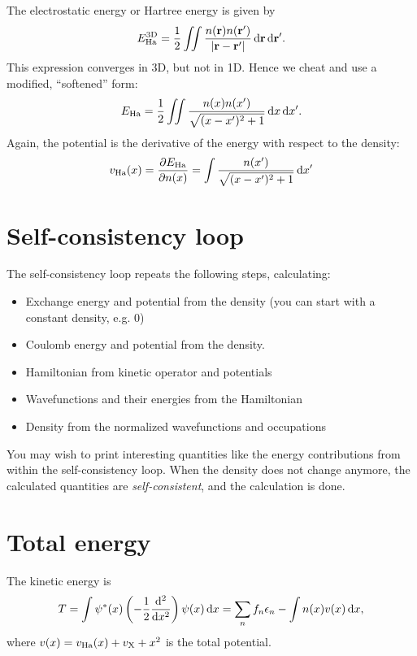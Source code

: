 \documentclass{article}
\begin{document}
The electrostatic energy or Hartree energy is given by
\begin{align}
  E_{\mathrm{Ha}}^{\mathrm{3D}} = \frac12 \iint \frac{n(\mathbf r)n(\mathbf r')}{|\mathbf r - \mathbf r'|}\,\mathrm d \mathbf r \,\mathrm d \mathbf r'.
\end{align}
This expression converges in 3D, but not in 1D.  Hence we cheat and use
a modified, ``softened'' form:
\begin{align}
E_{\mathrm{Ha}} = \frac12 \iint \frac{n(x) n(x')}{\sqrt{(x - x')^2 + 1}}
\,\mathrm d x \,\mathrm d x'.
\end{align}
Again, the potential is the derivative of the energy with respect to the
density:
\begin{align}
  v_{\mathrm{Ha}}(x) = \frac{\partial E_{\mathrm{Ha}}}{\partial n(x)} =
  \int \frac{n(x')}{\sqrt{(x - x')^2 + 1}} \,\mathrm d x'
\end{align}


\section*{Self-consistency loop}
The self-consistency loop repeats the following steps, calculating:
\begin{itemize}
\item Exchange energy and potential from the density (you can start with a
  constant density, e.g. 0)
\item Coulomb energy and potential from the density.
\item Hamiltonian from kinetic operator and potentials
\item Wavefunctions and their energies from the Hamiltonian
\item Density from the normalized wavefunctions and occupations
\end{itemize}



\noindent You may wish to print interesting quantities like the energy
contributions from within the self-consistency loop.
When the
density does not change anymore, the calculated quantities are
\emph{self-consistent}, and the calculation is done.

\section*{Total energy}
The kinetic energy is
\begin{align}
  T = \int \psi^*(x)\left(-\frac12 \frac{\mathrm d ^2}{\mathrm d x^2}\right) \psi(x) \,\mathrm d x
  = \sum_n f_n \epsilon_n - \int n(x) v(x) \,\mathrm d x,
\end{align}
where $v(x) = v_{\mathrm{Ha}}(x) + v_{\mathrm{X}} + x^2$ is the total potential.
\end{document}
